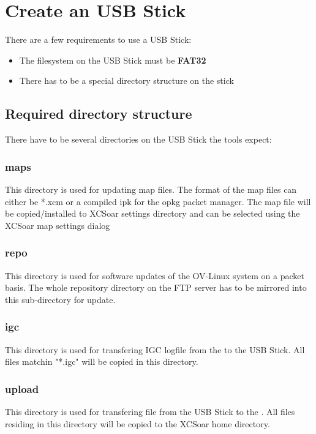 \section{Create an USB Stick}

There are a few requirements to use a USB Stick:
\begin{itemize}
	\item The filesystem on the USB Stick must be \textbf{FAT32}
	\item There has to be a special directory structure on the stick
\end{itemize}

\subsection{Required directory structure}
There have to be several directories on the USB Stick the tools expect:


\subsubsection{maps}
This directory is used for updating map files. 
The format of  the map files can either be *.xcm or a compiled ipk for the opkg packet manager.
The map file will be copied/installed to XCSoar settings directory and can be selected using the XCSoar map settings dialog

\subsubsection{repo}
This directory is used for software updates of the OV-Linux system on a packet basis.
The whole repository directory on the FTP server has to be mirrored into this sub-directory for update.

\subsubsection{igc}
This directory is used for transfering IGC logfile from the \ovfc to the USB Stick. All files matchin "*.igc" will be copied in this directory.

\subsubsection{upload}
This directory is used for transfering file from the USB Stick to the \ovfc.
All files residing in this directory will be copied to the XCSoar home directory.

